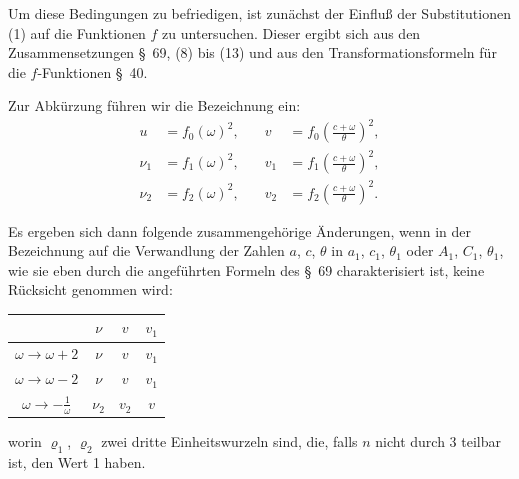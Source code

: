 \documentclass[12pt,a4paper]{article}
\theoremstyle{definition}
\begin{document}
Um diese Bedingungen zu befriedigen, ist zunächst der Einfluß der Substitutionen (1) auf die Funktionen $f$ zu untersuchen. Dieser ergibt sich aus den Zusammensetzungen \S\ 69, (8) bis (13) und aus den Transformationsformeln für die $f$-Funktionen \S\ 40.

Zur Abkürzung führen wir die Bezeichnung ein:
\begin{equation}\label{eq:73-3}
\begin{aligned}
u &= f_0(\omega)^2, &\quad v &= f_0\left(\frac{c + \omega}{\theta}\right)^2, \\
\nu_1 &= f_1(\omega)^2, &\quad v_1 &= f_1\left(\frac{c + \omega}{\theta}\right)^2, \\
\nu_2 &= f_2(\omega)^2, &\quad v_2 &= f_2\left(\frac{c + \omega}{\theta}\right)^2.
\end{aligned}
\end{equation}

Es ergeben sich dann folgende zusammengehörige Änderungen, wenn in der Bezeichnung auf die Verwandlung der Zahlen $a$, $c$, $\theta$ in $a_1$, $c_1$, $\theta_1$ oder $A_1$, $C_1$, $\theta_1$, wie sie eben durch die angeführten Formeln des \S\ 69 charakterisiert ist, keine Rücksicht genommen wird:

\begin{center}
\begin{tabular}{c|ccc}
& $\nu$ & $v$ & $v_1$ \\
\midrule
$\omega \to \omega + 2$ & $\nu$ & $v$ & $v_1$ \\
$\omega \to \omega - 2$ & $\nu$ & $v$ & $v_1$ \\
$\omega \to -\frac{1}{\omega}$ & $\nu_2$ & $v_2$ & $v$ \\
\end{tabular}
\end{center}

worin $\varrho_1$, $\varrho_2$ zwei dritte Einheitswurzeln sind, die, falls $n$ nicht durch 3 teilbar ist, den Wert 1 haben.
\end{document}
